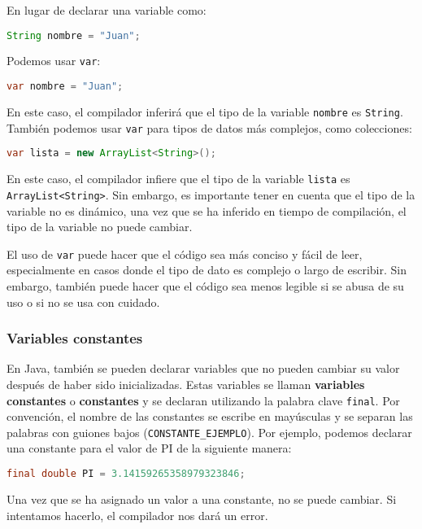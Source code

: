 \documentclass{article}
\begin{document}
En lugar de declarar una variable como:

\begin{lstlisting}[language=Java]
String nombre = "Juan";
\end{lstlisting}

Podemos usar \texttt{var}:

\begin{lstlisting}[language=Java]
var nombre = "Juan";
\end{lstlisting}

En este caso, el compilador inferirá que el tipo de la variable \texttt{nombre} es \texttt{String}. También podemos usar \texttt{var} para tipos de datos más complejos, como colecciones:

\begin{lstlisting}[language=Java]
var lista = new ArrayList<String>();
\end{lstlisting}

En este caso, el compilador infiere que el tipo de la variable \texttt{lista} es \texttt{ArrayList<String>}. Sin embargo, es importante tener en cuenta que el tipo de la variable no es dinámico, una vez que se ha inferido en tiempo de compilación, el tipo de la variable no puede cambiar.

El uso de \texttt{var} puede hacer que el código sea más conciso y fácil de leer, especialmente en casos donde el tipo de dato es complejo o largo de escribir. Sin embargo, también puede hacer que el código sea menos legible si se abusa de su uso o si no se usa con cuidado.

\subsubsection*{Variables constantes}
En Java, también se pueden declarar variables que no pueden cambiar su valor después de haber sido inicializadas. Estas variables se llaman \textbf{variables constantes} o \textbf{constantes} y se declaran utilizando la palabra clave \lstinline{final}.
Por convención, el nombre de las constantes se escribe en mayúsculas y se separan las palabras con guiones bajos (\lstinline{CONSTANTE_EJEMPLO}).
Por ejemplo, podemos declarar una constante para el valor de PI de la siguiente manera:

\begin{lstlisting}[language=Java]
final double PI = 3.14159265358979323846;
\end{lstlisting}
Una vez que se ha asignado un valor a una constante, no se puede cambiar. Si intentamos hacerlo, el compilador nos dará un error.
\end{document}
